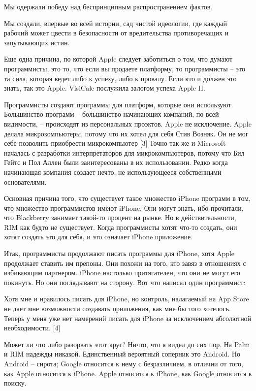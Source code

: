 \documentclass[ebook,12pt,oneside,openany]{memoir}
\begin{document}
Мы одержали победу над беспринципным распространением фактов.

Мы создали, впервые во всей истории, сад чистой идеологии, где каждый
рабочий может цвести в безопасности от вредительства противоречащих и
запутывающих истин.

Еще одна причина, по которой Apple следует заботиться о том, что
думают программисты, это то, что если вы продаете платформу, то
программисты – это та сила, которая ведет либо к успеху, либо к
провалу. Если кто и должен это знать, так это Apple. VisiCalc
послужила залогом успеха Apple II.

Программисты создают программы для платформ, которые они используют.
Большинство программ – большинство начинающих компаний, по всей
видимости, – происходят из персональных проэктов. Apple не исключение.
Apple делала микрокомпьютеры, потому что их хотел для себя Стив
Возняк. Он не мог себе позволить приобрести микрокомпьютер [3] Точно
так же и Microsoft началась с разработки интерпретаторов для
микрокомпьютеров, потому что Бил Гейтс и Пол Аллен были заинтересованы
в их использовании. Редко когда начинающая компания создает нечто, не
использующееся собственными основателями.

Основная причина того, что существует такое множество iPhone программ
в том, что множество программистов имеют iPhone. Они могут знать, ибо
прочитали, что Blackberry занимает такой-то процент на рынке. Но в
действительности, RIM как будто не существует. Когда программисты
хотят что-то создать, они хотят создать это для себя, и это означает
iPhone приложение.

Итак, программисты продолжают писать программы для iPhone, хотя Apple
продолжает ставить им препоны. Они похожи на того, кто завяз в
отношениях с избивающим партнером. iPhone настолько притягателен, что
они не могут его покинуть. Но они поглядывают на сторону. Вот что
написал один программист:

Хотя мне и нравилось писать для iPhone, но контроль, налагаемый на App
Store не дает мне возможности создавать приложения, как мне бы того
хотелось. Теперь у меня уже нет намерений писать для iPhone за
исключением абсолютной необходимости. [4]

Может ли что либо разорвать этот круг? Ничто, что я видел до сих пор.
На Palm и RIM надежды никакой. Единственный вероятный соперник это
Android. Но Android – сирота; Google относится к нему с безразличием,
в отличии от того, как Apple относится к iPhone. Apple относится к
iPhone, как Google относится к поиску.
\end{document}
